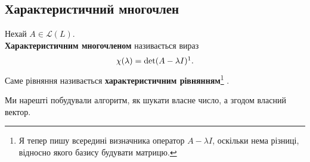 \documentclass{math_library}
\begin{document}
\subsection{Характеристичний многочлен}
\begin{definition}
Нехай $A \in \mathcal{L}(L)$. \\
\textbf{Характеристичним многочленом} називається вираз
\begin{align*}
\chi(\lambda) = \det(A - \lambda I)\footnotemark.
\end{align*}
Саме рівняння називається \textbf{характеристичним рівнянням}\footnote{Я тепер пишу всередині визначника оператор $A - \lambda I$, оскільки нема різниці, відносно якого базису будувати матрицю.} .
\end{definition}

Ми нарешті побудували алгоритм, як шукати власне число, а згодом власний вектор.
\end{document}
